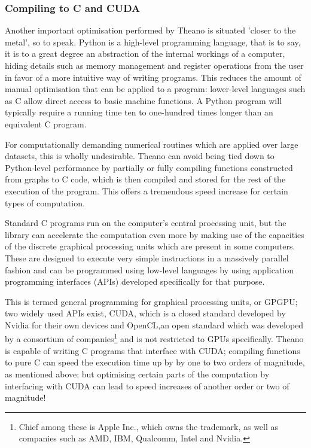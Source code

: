 \subsubsection{Compiling to C and CUDA}
\label{sec:graph}
Another important optimisation performed by Theano is situated 'closer
to the metal', so to speak. Python is a high-level programming
language, that is to say, it is to a great degree an abstraction of
the internal workings of a computer, hiding details such as memory
management and register operations from the user in favor of a more
intuitive way of writing programs. This reduces the amount of manual
optimisation that can be applied to a program: lower-level languages
such as C allow direct access to basic machine functions. A Python
program will typically require a running time ten to one-hundred times
longer than an equivalent C program.

For computationally demanding numerical routines which are applied
over large datasets, this is wholly undesirable. Theano can avoid
being tied down to Python-level performance by partially or fully
compiling functions constructed from graphs to C code, which is then
compiled and stored for the rest of the execution of the
program. This offers a tremendous speed increase for certain types of
computation.

Standard C programs run on the computer's central processing unit, but
the library can accelerate the computation even more by making use of
the capacities of the discrete graphical processing units which are
present in some computers. These are designed to execute very simple
instructions in a massively parallel fashion and can be programmed
using low-level languages by using application programming interfaces
(APIs) developed specifically for that purpose. 

This is termed general programming for graphical processing units, or
GPGPU; two widely used APIs exist, CUDA, which is a closed standard
developed by Nvidia for their own devices and OpenCL,an open standard
which was developed by a consortium of companies\footnote{Chief among
these is Apple Inc., which owns the trademark, as well as companies
such as AMD, IBM, Qualcomm, Intel and Nvidia.} and is not restricted
to GPUs specifically. Theano is capable of writing C programs that
interface with CUDA; compiling functions to pure C can speed the
execution time up by by one to two orders of magnitude, as mentioned
above; but optimising certain parts of the computation by interfacing
with CUDA can lead to speed increases of another order or two of
magnitude!

